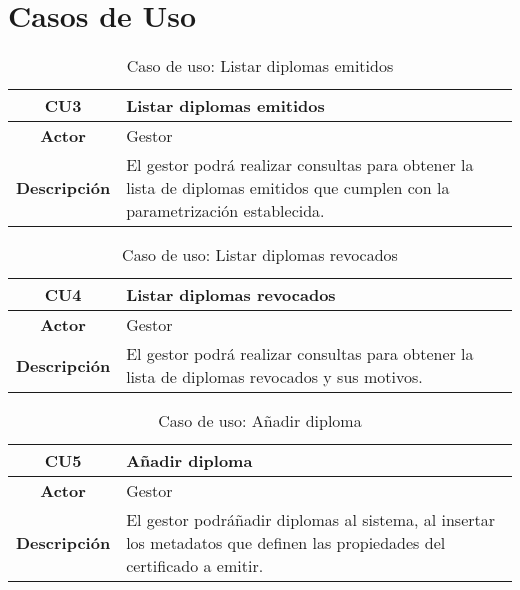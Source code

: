 \renewcommand{\appendixname}{Anexos}
\appendix
\chapter{Casos de Uso} \label{appendix:useCase}

\begin{table}[!h]
	\begin{center}
		\begin{tabular}{|c|p{10cm}|}
			\hline \textbf{CU3} & Listar diplomas emitidos \\ 
			\hline \textbf{Actor} & Gestor\\ 
			\hline \textbf{Descripci\'on} & El gestor podr\'a realizar consultas para obtener la lista de diplomas emitidos que cumplen con la parametrizaci\'on establecida. \\ 
			\hline 
		\end{tabular}
		\caption{Caso de uso: Listar diplomas emitidos}
		\label{tab:CU3}
	\end{center}
\end{table}

\begin{table}[!h]
	\begin{center}
		\begin{tabular}{|c|p{10cm}|}
			\hline \textbf{CU4} & Listar diplomas revocados \\ 
			\hline \textbf{Actor} & Gestor\\ 
			\hline \textbf{Descripci\'on} & El gestor podr\'a realizar consultas para obtener la lista de diplomas revocados y sus motivos. \\ 
			\hline 
		\end{tabular}
		\caption{Caso de uso: Listar diplomas revocados}
		\label{tab:CU4}
	\end{center}
\end{table}

\begin{table}[!h]
	\begin{center}
		\begin{tabular}{|c|p{10cm}|}
			\hline \textbf{CU5} & A\~nadir diploma \\ 
			\hline \textbf{Actor} & Gestor\\ 
			\hline \textbf{Descripci\'on} & El gestor podr\' a\~nadir diplomas al sistema, al insertar los metadatos que definen las propiedades del certificado a emitir. \\ 
			\hline 
		\end{tabular}
		\caption{Caso de uso: A\~nadir diploma}
		\label{tab:CU5}
	\end{center}
\end{table}

